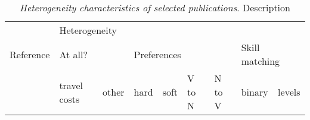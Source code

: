 

\begin{table}[t]
	\tableConfig
	\begin{tabular*}{\textwidth}{@{\extracolsep{\fill}}lcccccccc}
		\toprule
		\multicolumn{1}{l}{} 												&
		\multicolumn{8}{l}{Heterogeneity} 									\\
		\cmidrule(rl){2-9}
		\multicolumn{1}{l}{Reference} 										&
		\multicolumn{2}{l}{At all?}											&			
		\multicolumn{4}{l}{Preferences} 									&
		\multicolumn{2}{l}{Skill matching} 									\\
		\cmidrule(rl){2-3} \cmidrule(rl){4-7} \cmidrule{8-9} %
		\multicolumn{1}{l}{} &
		\multicolumn{1}{l}{travel costs} &
		\multicolumn{1}{l}{other} &
		\multicolumn{1}{l}{hard} &
		\multicolumn{1}{l}{soft} &
		\multicolumn{1}{l}{V to N} &
		\multicolumn{1}{l}{N to V} &
		\multicolumn{1}{l}{binary} &
		\multicolumn{1}{l}{levels} \\
		\bottomrule
		
	\end{tabular*} 
	\caption[Heterogeneity characteristics of selected publications]{%
		\label{tab:heterogeneity-compare}%
		\textit{Heterogeneity characteristics of selected publications}. Description}
\end{table}
